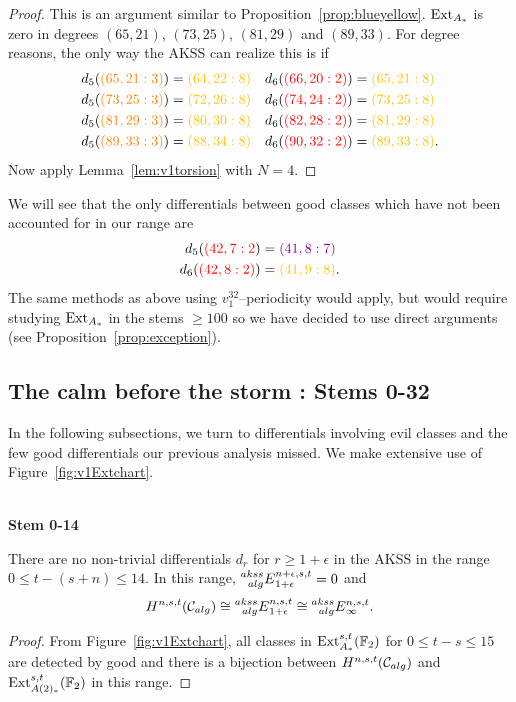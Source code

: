 \begin{proof}
This is an argument similar to Proposition~\ref{prop:blueyellow}.
$\operatorname{Ext}_{A_*}$ is zero in degrees $(65,21)$, $(73,25)$, $(81,29)$ and $(89,33)$. For degree reasons, the only way the AKSS can realize this is if
\begin{align*}
d_5( {\color{orange}(65,21:3)}) &= {\color{goldenpoppy}(64,22:8)} & d_6( {\color{red}(66,20:2)}) &= {\color{goldenpoppy}(65,21:8)} \\
d_5( {\color{orange}(73,25:3)}) &= {\color{goldenpoppy}(72,26:8)} & d_6( {\color{red}(74,24:2)}) &= {\color{goldenpoppy}(73,25:8)} \\
d_5( {\color{orange}(81,29:3)}) &= {\color{goldenpoppy}(80,30:8)} & d_6( {\color{red}(82,28:2)}) &= {\color{goldenpoppy}(81,29:8)} \\
d_5( {\color{orange}(89,33:3)}) &= {\color{goldenpoppy}(88,34:8)} & d_6( {\color{red}(90,32:2)}) &= {\color{goldenpoppy}(89,33:8)}.
\end{align*}
Now apply Lemma~\ref{lem:v1torsion} with $N=4$.
\end{proof}


\begin{rmk}
We will see that the only differentials between good classes which have not been accounted for in our range are
\begin{align*}
d_5( {\color{red}(42,7:2}) &= {\color{darkmagenta}(41,8:7)}  \\
d_6( {\color{red}(42,8:2)}) &= {\color{goldenpoppy}(41,9:8)} .
\end{align*}
The same methods as above using $v_1^{32}$--periodicity would apply, but would require studying $\operatorname{Ext}_{A_*}$ in the stems $\geq 100$ so we have decided to use direct arguments (see Proposition~\ref{prop:exception}).
\end{rmk}




\subsection*{The calm before the storm : Stems 0-32}
In the following subsections, we turn to differentials involving evil classes and the few good differentials our previous analysis missed. We make extensive use of Figure~\ref{fig:v1Extchart}.




\ \\
\noindent
{\bf Stem 0-14}

\begin{prop}
There are no non-trivial differentials $d_r$ for $r \geq 1+\epsilon$ in the AKSS in the range $0 \leq t-(s+n) \leq 14$. In this range, $  \prescript{akss}{alg}{E}^{n+\epsilon,s,t}_{1+\epsilon} =0$ and
\[H^{n,s,t}(\mathcal{C}_{alg}) \cong  \prescript{akss}{alg}{E}^{n,s,t}_{1+\epsilon} \cong  \prescript{akss}{alg}{E}^{n,s,t}_{\infty} .\]
\end{prop}
\begin{proof}
From Figure~\ref{fig:v1Extchart}, all classes in $\operatorname{Ext}_{A_*}^{s,t}(\mathbb{F}_2)$ for $0\leq t-s\leq 15$ are detected by good and there is a bijection between $H^{n,s,t}(\mathcal{C}_{alg})$ and $\operatorname{Ext}_{A(2)_*}^{s,t}(\mathbb{F}_2)$ in this range.
\end{proof}


